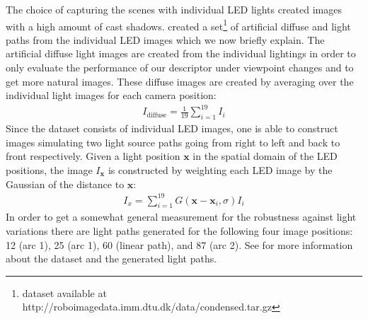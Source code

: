 \documentclass[thesis.tex]{subfiles}
\begin{document}
The choice of capturing the scenes with individual LED lights created images with a high amount of cast shadows. \citet{larsen2012jet} created a set\footnote{dataset available at http://roboimagedata.imm.dtu.dk/data/condensed.tar.gz} of artificial diffuse and light paths from the individual LED images which we now briefly explain. The artificial diffuse light images are created from the individual lightings in order to only evaluate the performance of our descriptor under viewpoint changes and to get more natural images. These diffuse images are created by averaging over the individual light images for each camera position:
\begin{align}
	I_{\text{diffuse}} = \frac{1}{19} \sum_{i = 1}^{19} I_{i}
\end{align}
Since the dataset consists of individual LED images, one is able to construct images simulating two light source paths going from right to left and back to front respectively.
Given a light position ${\boldsymbol{x}}$ in the spatial domain of the LED positions, the image $I_{\boldsymbol{x}}$ is constructed by weighting each LED image by the Gaussian of the distance to ${\boldsymbol{x}}$:
\begin{align}
	I_{x} = \sum_{i = 1}^{19} G(\boldsymbol{x} - \boldsymbol{x}_i,\sigma) I_{i}
\end{align}
In order to get a somewhat general measurement for the robustness against light variations there are light paths generated for the following four image positions: 12 (arc 1), 25 (arc 1), 60 (linear path), and 87 (arc 2).
See \citet{aanaes2010recall,aanaes2010ground} for more information about the dataset and the generated light paths.
\end{document}

